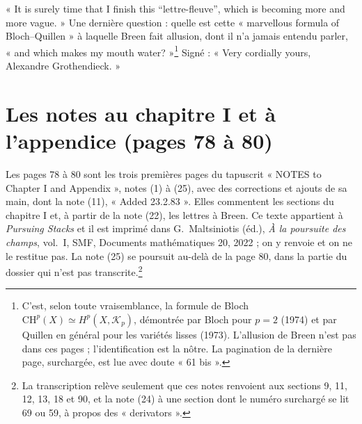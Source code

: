 \documentclass[11pt,a4paper]{article}
\begin{document}
« It is surely time that I finish this “lettre-fleuve”, which is becoming
more and more vague. » Une dernière question : quelle est cette « marvellous
formula of Bloch--Quillen » à laquelle Breen fait allusion, dont il n'a
jamais entendu parler, « and which makes my mouth water? »\footnote{C'est,
selon toute vraisemblance, la formule de Bloch
$\mathrm{CH}^p(X) \simeq H^p(X,\mathcal{K}_p)$, démontrée par Bloch pour
$p = 2$ (1974) et par Quillen en général pour les variétés lisses (1973).
L'allusion de Breen n'est pas dans ces pages ; l'identification est la
nôtre. La pagination de la dernière page, surchargée, est lue avec doute
« 61 bis ».} Signé : « Very cordially yours, Alexandre Grothendieck. »

\section*{Les notes au chapitre I et à l'appendice (pages 78 à 80)}

Les pages 78 à 80 sont les trois premières pages du tapuscrit « NOTES to
Chapter I and Appendix », notes (1) à (25), avec des corrections et ajouts
de sa main, dont la note (11), « Added 23.2.83 ». Elles commentent les
sections du chapitre I et, à partir de la note (22), les lettres à Breen.
Ce texte appartient à \emph{Pursuing Stacks} et il est imprimé dans
G.~Maltsiniotis (éd.), \emph{À la poursuite des champs}, vol.~I, SMF,
Documents mathématiques 20, 2022 ; on y renvoie et on ne le restitue pas. La
note (25) se poursuit au-delà de la page 80, dans la partie du dossier qui
n'est pas transcrite.\footnote{La transcription relève seulement que ces
notes renvoient aux sections 9, 11, 12, 13, 18 et 90, et la note (24) à une
section dont le numéro surchargé se lit 69 ou 59, à propos des
« derivators ».}
\end{document}

